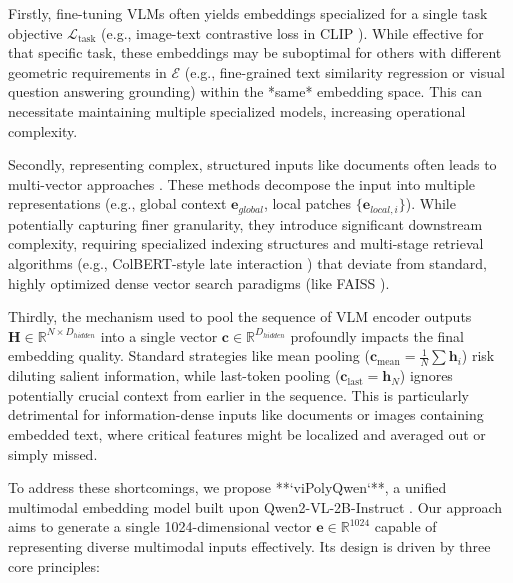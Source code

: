 Firstly, fine-tuning VLMs often yields embeddings specialized for a single task objective $\mathcal{L}_{\text{task}}$ (e.g., image-text contrastive loss in CLIP \cite{radford2021learning}). While effective for that specific task, these embeddings may be suboptimal for others with different geometric requirements in $\mathcal{E}$ (e.g., fine-grained text similarity regression or visual question answering grounding) within the *same* embedding space. This can necessitate maintaining multiple specialized models, increasing operational complexity.

Secondly, representing complex, structured inputs like documents often leads to multi-vector approaches \cite{faysse2024colpali, zhang2023beyond}. These methods decompose the input into multiple representations (e.g., global context $\mathbf{e}_{global}$, local patches $\{\mathbf{e}_{local,i}\}$). While potentially capturing finer granularity, they introduce significant downstream complexity, requiring specialized indexing structures and multi-stage retrieval algorithms (e.g., ColBERT-style late interaction \cite{khattab2020colbert}) that deviate from standard, highly optimized dense vector search paradigms (like FAISS \cite{johnson2019billion}).

Thirdly, the mechanism used to pool the sequence of VLM encoder outputs $\mathbf{H} \in \mathbb{R}^{N \times D_{hidden}}$ into a single vector $\mathbf{c} \in \mathbb{R}^{D_{hidden}}$ profoundly impacts the final embedding quality. Standard strategies like mean pooling ($\mathbf{c}_{\text{mean}} = \frac{1}{N}\sum \mathbf{h}_i$) risk diluting salient information, while last-token pooling ($\mathbf{c}_{\text{last}} = \mathbf{h}_N$) ignores potentially crucial context from earlier in the sequence. This is particularly detrimental for information-dense inputs like documents or images containing embedded text, where critical features might be localized and averaged out or simply missed.

To address these shortcomings, we propose **`viPolyQwen`**, a unified multimodal embedding model built upon Qwen2-VL-2B-Instruct \cite{bai2023qwen}. Our approach aims to generate a single 1024-dimensional vector $\mathbf{e} \in \mathbb{R}^{1024}$ capable of representing diverse multimodal inputs effectively. Its design is driven by three core principles:

